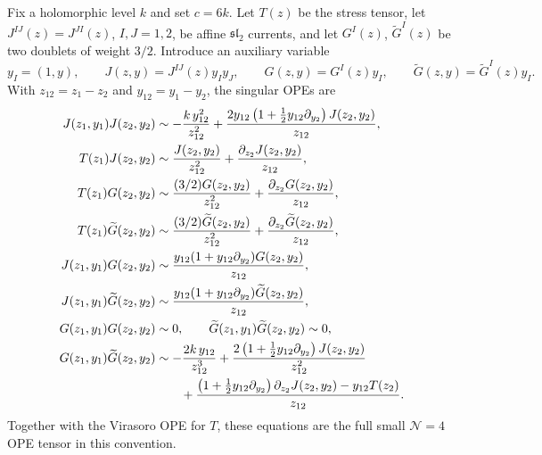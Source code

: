 \begin{definition}[Small \(\mathcal N=4\) OPE convention]
\label{def:small-n4-auxiliary-y-ope}
Fix a holomorphic level \(k\) and set \(c=6k\).  Let \(T(z)\) be the stress
tensor, let \(J^{IJ}(z)=J^{JI}(z)\), \(I,J=1,2\), be affine
\(\mathfrak{sl}_2\) currents, and let \(G^I(z)\), \(\widetilde G^I(z)\) be
two doublets of weight \(3/2\).  Introduce an auxiliary variable
\[
  y_I=(1,y),
  \qquad
  J(z,y)=J^{IJ}(z)y_Iy_J,
  \qquad
  G(z,y)=G^I(z)y_I,
  \qquad
  \widetilde G(z,y)=\widetilde G^I(z)y_I .
\]
With \(z_{12}=z_1-z_2\) and \(y_{12}=y_1-y_2\), the singular OPEs are
\begin{align}
  J(z_1,y_1)J(z_2,y_2)
  &\sim
  -\frac{k\,y_{12}^2}{z_{12}^2}
  +
  \frac{
    2y_{12}\left(1+\frac12y_{12}\partial_{y_2}\right)J(z_2,y_2)
  }{z_{12}},
  \label{eq:small-n4-jj-aux-ope}\\
  T(z_1)J(z_2,y_2)
  &\sim
  \frac{J(z_2,y_2)}{z_{12}^2}
  +\frac{\partial_{z_2}J(z_2,y_2)}{z_{12}},
  \label{eq:small-n4-tj-aux-ope}\\
  T(z_1)G(z_2,y_2)
  &\sim
  \frac{(3/2)G(z_2,y_2)}{z_{12}^2}
  +\frac{\partial_{z_2}G(z_2,y_2)}{z_{12}},
  \label{eq:small-n4-tg-aux-ope}\\
  T(z_1)\widetilde G(z_2,y_2)
  &\sim
  \frac{(3/2)\widetilde G(z_2,y_2)}{z_{12}^2}
  +\frac{\partial_{z_2}\widetilde G(z_2,y_2)}{z_{12}},
  \label{eq:small-n4-tgt-aux-ope}\\
  J(z_1,y_1)G(z_2,y_2)
  &\sim
  \frac{
    y_{12}(1+y_{12}\partial_{y_2})G(z_2,y_2)
  }{z_{12}},
  \label{eq:small-n4-jg-aux-ope}\\
  J(z_1,y_1)\widetilde G(z_2,y_2)
  &\sim
  \frac{
    y_{12}(1+y_{12}\partial_{y_2})\widetilde G(z_2,y_2)
  }{z_{12}},
  \label{eq:small-n4-jgt-aux-ope}\\
  G(z_1,y_1)G(z_2,y_2)
  &\sim 0,
  \qquad
  \widetilde G(z_1,y_1)\widetilde G(z_2,y_2)\sim0,
  \label{eq:small-n4-same-supercurrent-aux-ope}\\
  G(z_1,y_1)\widetilde G(z_2,y_2)
  &\sim
  -\frac{2k\,y_{12}}{z_{12}^3}
  +
  \frac{
    2\left(1+\frac12y_{12}\partial_{y_2}\right)J(z_2,y_2)
  }{z_{12}^2}
  \notag\\
  &\qquad
  +
  \frac{
    \left(1+\frac12y_{12}\partial_{y_2}\right)
    \partial_{z_2}J(z_2,y_2)
    -y_{12}T(z_2)
  }{z_{12}} .
  \label{eq:small-n4-ggt-aux-ope}
\end{align}
Together with the Virasoro OPE for \(T\), these equations are the full small
\(\mathcal N=4\) OPE tensor in this convention.
\end{definition}

